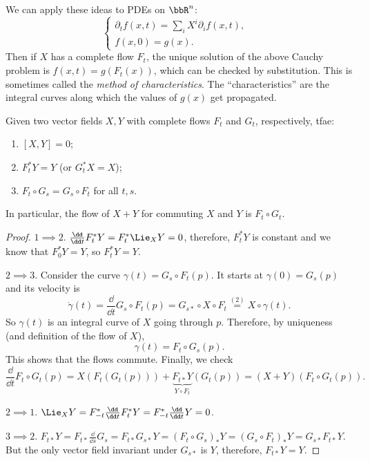 \begin{rem}
    We can apply these ideas to PDEs on $\bbR^n$:
    \[\begin{cases}
        \partial_t f(x,t)=\sum _i X^i \partial_i f(x,t),&\\
        f(x,0)=g(x).&
    \end{cases}\]
    Then if $X$ has a complete flow $F_t$, the unique solution of the above Cauchy problem is $f(x,t)=g(F_t(x))$, which can be checked by substitution. This is sometimes called the \emph{method of characteristics}. The ``characteristics'' are the integral curves along which the values of $g(x)$ get propagated.
\end{rem}

\begin{prop}
    Given two vector fields $X,Y$ with complete flows $F_t$ and $G_t$, respectively, \gls{tfae}:
    \begin{enumerate}
        \item $[X,Y]=0$;
        \item $F^\ast_t Y=Y$ (or $G^\ast_t X=X$);
        \item $F_t\circ G_s=G_s\circ F_t$ for all $t,s$. 
    \end{enumerate}
    In particular, the flow of $X+Y$ for commuting $X$ and $Y$ is $F_t\circ G_t$.
\end{prop}
\begin{proof}
    $1\implies 2$. $\frac{\dd}{\dd t}F^\ast_t Y=F^\ast_t \Lie_X Y=0$, therefore, $F^\ast_t Y$ is constant and we know that $F^\ast_0 Y=Y$, so $F^\ast_t Y=Y$.

    $2\implies 3$. Consider the curve $\gamma(t)=G_s\circ F_t(p)$. It starts at $\gamma(0)=G_s(p)$ and its velocity is
    \[\dot\gamma(t)=\frac{\dd}{\dd t} G_s\circ F_t(p)=G_{s\ast}\circ X\circ F_t\overset{(2)}{=}X\circ\gamma(t).\]
    So $\gamma(t)$ is an integral curve of $X$ going through $p$. Therefore, by uniqueness (and definition of the flow of $X$), 
    \[\gamma(t)=F_t\circ G_s(p).\]
    This shows that the flows commute. Finally, we check 
    \[\frac{\dd}{\dd t} F_t\circ G_t(p)=X(F_t(G_t(p)))+\underbrace{F_{t\ast }Y}_{Y\circ F_t}(G_t(p))=(X+Y)(F_t\circ G_t(p)).\]

    $2\implies 1$. $\Lie_X Y=F^\ast_{-t}\frac{\dd}{\dd t}F^\ast_t Y=F^\ast_{-t} \frac{\dd}{\dd t}Y=0$.

    $3\implies 2$. $F_{t\ast}Y=F_{t\ast}\frac{\dd}{\dd s}G_s=F_{t\ast} G_{s\ast} Y=(F_t\circ G_s)_\ast Y=(G_s\circ F_t)_\ast Y=G_{s\ast}F_{t\ast}Y$. But the only vector field invariant under $G_{s\ast}$ is $Y$, therefore, $F_{t\ast}Y=Y$.
\end{proof}

